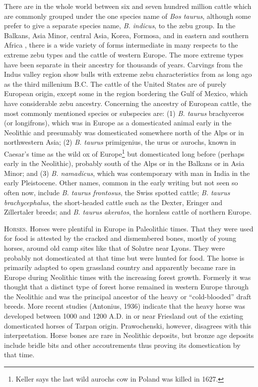 There are in the whole world between six and seven hundred million cattle which are commonly grouped under
the one species name of \textit{Bos taurus}, although some prefer to give a separate species name,
\textit{B. indicus}, to the zebu group. In the Balkans, Asia Minor, central Asia, Korea, Formosa, and in
eastern and southern Africa , there is a wide variety of forms intermediate in many respects to the extreme
zebu types and the cattle of western Europe. The more extreme types have been separate in their ancestry
for thousands of years. Carvings from the Indus valley region show bulls with extreme zebu characteristics
from as long ago as the third millenium B.C. The cattle of the United States are of purely European origin,
except some in the region bordering the Gulf of Mexico, which have considerable zebu ancestry. Concerning
the ancestry of European cattle, the most commonly mentioned species or subspecies are: (1) \textit{B. taurus}
brachyceros (or longifrons), which was in Europe as a domesticated animal early in the Neolithic and presumably
was domesticated somewhere north of the Alps or in northwestern Asia; (2) \textit{B. taurus} primigenius, the
urus or aurochs, known in Caesar's time as the wild ox of Europe\footnote{Keller says the last wild aurochs cow
in Poland was killed in 1627.} but domesticated long before (perhaps early in the Neolithic), probably south
of the Alps or in the Balkans or in Asia Minor; and (3) \textit{B. namadicus}, which was contemporary with man
in India in the early Pleistocene. Other names, common in the early writing but not seen so often now, include
\textit{B. taurus frontosus}, the Swiss spotted cattle; \textit{B. taurus brachycephalus}, the short-headed
cattle such as the Dexter, Eringer and Zillertaler breeds; and \textit{B. taurus akeratos}, the hornless
cattle of northern Europe.

\textsc{Horses}. Horses were plentiful in Europe in Paleolithic times. That they were used for food is attested
by the cracked and dismembered bones, mostly of young horses, around old camp sites like that of Solutre near
Lyons. They were probably not domesticated at that time but were hunted for food. The horse is primarily adapted
to open grassland country and apparently became rare in Europe during Neolithic times with the increasing forest
growth. Formerly it was thought that a distinct type of forest horse remained in western Europe through the
Neolithic and was the principal ancestor of the heavy or ``cold-blooded'' draft breeds. More recent studies
(Antonius, 1936) indicate that the heavy horse was developed between 1000 and 1200 A.D. in or near Friesland out
of the existing domesticated horses of Tarpan origin. Prawochenski, however, disagrees with this interpretation.
Horse bones are rare in Neolithic deposits, but bronze age deposits include bridle bits and other accoutrements
thus proving its domestication by that time.

